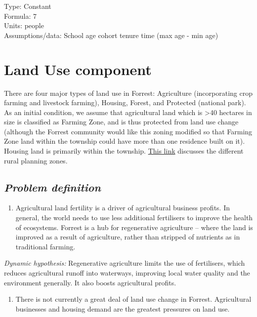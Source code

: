 \documentclass[
  11pt,
]{book}
\providecommand{\tightlist}{%
  \setlength{\itemsep}{0pt}\setlength{\parskip}{0pt}}
\begin{document}
Type: Constant\\
Formula: 7\\
Units: people\\
Assumptions/data: School age cohort tenure time (max age - min age)

\hypertarget{land-use-component}{%
\chapter{Land Use component}\label{land-use-component}}

There are four major types of land use in Forrest: Agriculture (incorporating crop farming and livestock farming), Housing, Forest, and Protected (national park). As an initial condition, we assume that agricultural land which is \textgreater40 hectares in size is classified as Farming Zone, and is thus protected from land use change (although the Forrest community would like this zoning modified so that Farming Zone land within the township could have more than one residence built on it). Housing land is primarily within the township. \href{https://www.planning.vic.gov.au/__data/assets/pdf_file/0027/97182/PPN42-Applying-the-Rural-Zones_June-2015.pdf}{This link} discusses the different rural planning zones.

\hypertarget{problem-definition-1}{%
\section{\texorpdfstring{\emph{Problem definition}}{Problem definition}}\label{problem-definition-1}}

\begin{enumerate}
\def\labelenumi{\arabic{enumi}.}
\tightlist
\item
  Agricultural land fertility is a driver of agricultural business profits. In general, the world needs to use less additional fertilisers to improve the health of ecosystems. Forrest is a hub for regenerative agriculture -- where the land is improved as a result of agriculture, rather than stripped of nutrients as in traditional farming.
\end{enumerate}

\emph{Dynamic hypothesis:}
Regenerative agriculture limits the use of fertilisers, which reduces agricultural runoff into waterways, improving local water quality and the environment generally. It also boosts agricultural profits.

\begin{enumerate}
\def\labelenumi{\arabic{enumi}.}
\setcounter{enumi}{1}
\tightlist
\item
  There is not currently a great deal of land use change in Forrest. Agricultural businesses and housing demand are the greatest pressures on land use.
\end{enumerate}
\end{document}
